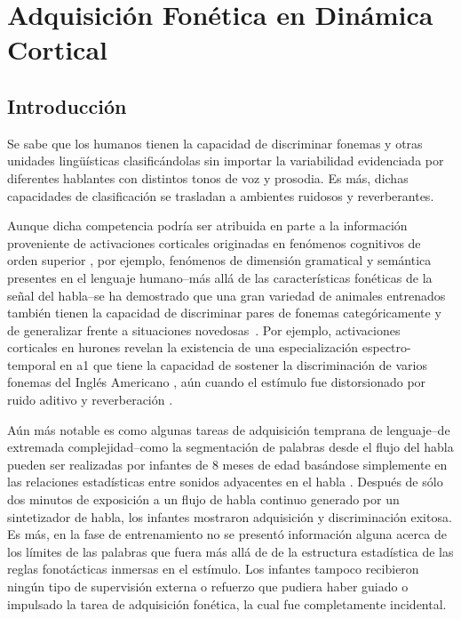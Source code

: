 \chapter{Adquisición Fonética en Dinámica Cortical}

\label{ch:phonetics}

\section{Introducción}


Se sabe que los humanos tienen la capacidad de discriminar fonemas y otras unidades lingüísticas clasificándolas sin importar la variabilidad evidenciada por diferentes hablantes con distintos tonos de voz y prosodia. Es más, dichas capacidades de clasificación se trasladan a ambientes ruidosos y reverberantes.

Aunque dicha competencia  podría ser atribuida en parte a la información proveniente de activaciones corticales originadas en fenómenos cognitivos de orden superior \cite{PMID:17451657}, por ejemplo, fenómenos de dimensión gramatical y semántica  \cite{OBLESER2011713,10.1093/cercor/bhp128} presentes en el lenguaje humano--más allá de las características fonéticas de la señal del habla--se  ha demostrado que una gran variedad de animales entrenados también tienen la capacidad de discriminar pares de fonemas categóricamente y de generalizar frente a situaciones novedosas~\cite{kuhl_1975, kuhl_1983, kluender_1998, pons_2006, hienz_1996, dent_1997, lotto_1997}. Por ejemplo, activaciones corticales en hurones revelan la existencia de una especialización espectro-temporal en \gls{a1} que tiene la capacidad de sostener la discriminación de varios fonemas del Inglés Americano \cite{mesgarani_2008}, aún cuando el estímulo fue distorsionado por ruido aditivo y reverberación \cite{mesgarani_2014A}.

Aún más notable es como algunas tareas de adquisición temprana de lenguaje--de extremada complejidad--como la segmentación de palabras desde el flujo del habla pueden ser realizadas por infantes de 8 meses de edad basándose simplemente en las relaciones estadísticas entre sonidos adyacentes en el habla \cite{Saffran1996StatisticalLB}. Después de sólo dos minutos de exposición a un flujo de habla continuo generado por un sintetizador de habla, los infantes mostraron adquisición y discriminación exitosa. Es más, en la fase de entrenamiento no se presentó información alguna acerca de los límites de las palabras que fuera más allá de de la estructura estadística de las reglas fonotácticas inmersas en el estímulo. Los infantes tampoco recibieron ningún tipo de supervisión externa o refuerzo que pudiera haber guiado o impulsado la tarea de adquisición fonética, la cual fue completamente incidental.

